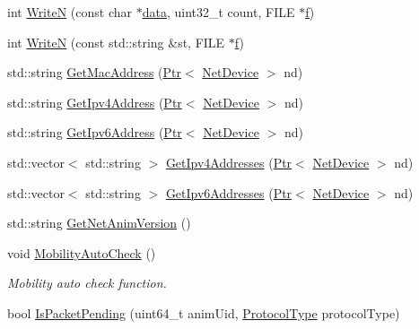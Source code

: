 \begin{DoxyCompactItemize}
\item 
int \hyperlink{classns3_1_1AnimationInterface_a4cdd131c35733674773098d094f30066}{WriteN} (const char $\ast$\hyperlink{topology-example-sim_8cc_a26c65296e316af77b787dc77469bb2a4}{data}, uint32\+\_\+t count, F\+I\+LE $\ast$\hyperlink{80211b_8c_ae7ffc1a8f84fa47a0812b2f2b9627132}{f})
\item 
int \hyperlink{classns3_1_1AnimationInterface_aeffe22db13868c8b612275dee4effe39}{WriteN} (const std\+::string \&st, F\+I\+LE $\ast$\hyperlink{80211b_8c_ae7ffc1a8f84fa47a0812b2f2b9627132}{f})
\item 
std\+::string \hyperlink{classns3_1_1AnimationInterface_a82c8e06d9c44523db90adb5424c08806}{Get\+Mac\+Address} (\hyperlink{classns3_1_1Ptr}{Ptr}$<$ \hyperlink{classns3_1_1NetDevice}{Net\+Device} $>$ nd)
\item 
std\+::string \hyperlink{classns3_1_1AnimationInterface_af000d578afa61b609866889aa38c4663}{Get\+Ipv4\+Address} (\hyperlink{classns3_1_1Ptr}{Ptr}$<$ \hyperlink{classns3_1_1NetDevice}{Net\+Device} $>$ nd)
\item 
std\+::string \hyperlink{classns3_1_1AnimationInterface_a89512d6e59613518d1b880e81ab6db1b}{Get\+Ipv6\+Address} (\hyperlink{classns3_1_1Ptr}{Ptr}$<$ \hyperlink{classns3_1_1NetDevice}{Net\+Device} $>$ nd)
\item 
std\+::vector$<$ std\+::string $>$ \hyperlink{classns3_1_1AnimationInterface_a73dca227bb2e3986b1ccfd83cdea2a4c}{Get\+Ipv4\+Addresses} (\hyperlink{classns3_1_1Ptr}{Ptr}$<$ \hyperlink{classns3_1_1NetDevice}{Net\+Device} $>$ nd)
\item 
std\+::vector$<$ std\+::string $>$ \hyperlink{classns3_1_1AnimationInterface_a6cb3ba286e8b93b93b1ef1e79ce4ee0e}{Get\+Ipv6\+Addresses} (\hyperlink{classns3_1_1Ptr}{Ptr}$<$ \hyperlink{classns3_1_1NetDevice}{Net\+Device} $>$ nd)
\item 
std\+::string \hyperlink{classns3_1_1AnimationInterface_a94791fd5dfe16bb39b94ab92fa6b5e64}{Get\+Net\+Anim\+Version} ()
\item 
void \hyperlink{classns3_1_1AnimationInterface_a23e31bf019017e94d49dd139718e93f4}{Mobility\+Auto\+Check} ()
\begin{DoxyCompactList}\small\item\em Mobility auto check function. \end{DoxyCompactList}\item 
bool \hyperlink{classns3_1_1AnimationInterface_a0bee27aa30e136d5035050ec2ef0012d}{Is\+Packet\+Pending} (uint64\+\_\+t anim\+Uid, \hyperlink{classns3_1_1AnimationInterface_a801a4efd553ff0d1d768cd70d22456b6}{Protocol\+Type} protocol\+Type)

\end{DoxyCompactItemize}
